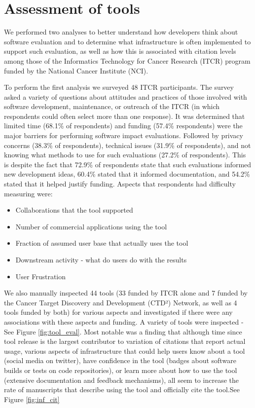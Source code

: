 \documentclass{article}
\begin{document}
\section{Assessment of tools}

We performed two analyses to better understand how developers think about software evaluation and to determine what infrastructure is often implemented to support such evaluation, as well as how this is associated with citation levels among those of the Informatics Technology for Cancer Research (ITCR) program funded by the National Cancer Institute (NCI). 

To perform the first analysis we surveyed 48 ITCR participants. The survey asked a variety of questions about attitudes and practices of those involved with software development, maintenance, or outreach of the ITCR (in which respondents could often select more than one response). It was determined that limited time (68.1\% of respondents) and funding (57.4\% respondents) were the major barriers for performing software impact evaluations. Followed by privacy concerns (38.3\% of respondents), technical issues (31.9\% of respondents), and not knowing what methods to use for such evaluations (27.2\% of respondents). This is despite the fact that 72.9\% of respondents state that such evaluations informed new development ideas, 60.4\% stated that it informed documentation, and 54.2\% stated that it helped justify funding. Aspects that respondents had difficulty measuring were:
\begin{itemize}
    \item Collaborations that the tool supported
    \item Number of commercial applications using the tool
    \item Fraction of assumed user base that actually uses the tool
    \item Downstream activity - what do users do with the results
    \item User Frustration
\end{itemize}

We also manually inspected 44 tools (33 funded by ITCR alone and 7 funded by the Cancer Target Discovery and Development (CTD²) Network, as well as 4 tools funded by both) for various aspects and investigated if there were any associations with these aspects and funding. A variety of tools were inspected - See Figure \ref{fig:tool_eval}. Most notable was a finding that although time since tool release is the largest contributor to variation of citations that report actual usage, various aspects of infrastructure that could help users know about a tool (social media on twitter), have confidence in the tool (badges about software builds or tests on code repositories), or learn more about how to use the tool (extensive documentation and feedback mechanisms), all seem to increase the rate of manuscripts that describe using the tool and officially cite the tool.See Figure \ref{fig:inf_cit}
\end{document}
